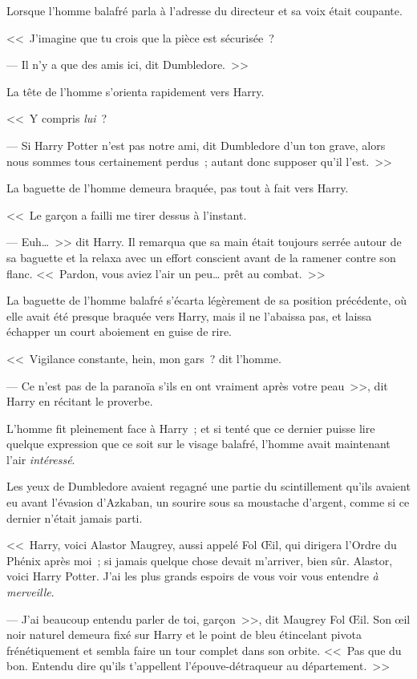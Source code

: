 Lorsque l'homme balafré parla à l'adresse du directeur et sa voix était coupante.

<<~J'imagine que tu crois que la pièce est sécurisée~?

--- Il n'y a que des amis ici, dit Dumbledore.~>>

La tête de l'homme s'orienta rapidement vers Harry.

<<~Y compris \emph{lui}~?

--- Si Harry Potter n'est pas notre ami, dit Dumbledore d'un ton grave, alors nous sommes tous certainement perdus~; autant donc supposer qu'il l'est.~>>

La baguette de l'homme demeura braquée, pas tout à fait vers Harry.

<<~Le garçon a failli me tirer dessus à l'instant.

--- Euh…~>> dit Harry. Il remarqua que sa main était toujours serrée autour de sa baguette et la relaxa avec un effort conscient avant de la ramener contre son flanc. <<~Pardon, vous aviez l'air un peu… prêt au combat.~>>

La baguette de l'homme balafré s'écarta légèrement de sa position précédente, où elle avait été presque braquée vers Harry, mais il ne l'abaissa pas, et laissa échapper un court aboiement en guise de rire.

<<~Vigilance constante, hein, mon gars~? dit l'homme.

--- Ce n'est pas de la paranoïa s'ils en ont vraiment après votre peau~>>, dit Harry en récitant le proverbe.

L'homme fit pleinement face à Harry~; et si tenté que ce dernier puisse lire quelque expression que ce soit sur le visage balafré, l'homme avait maintenant l'air \emph{intéressé}.

Les yeux de Dumbledore avaient regagné une partie du scintillement qu'ils avaient eu avant l'évasion d'Azkaban, un sourire sous sa moustache d'argent, comme si ce dernier n'était jamais parti.

<<~Harry, voici Alastor Maugrey, aussi appelé Fol Œil, qui dirigera l'Ordre du Phénix après moi~; si jamais quelque chose devait m'arriver, bien sûr. Alastor, voici Harry Potter. J'ai les plus grands espoirs de vous voir vous entendre \emph{à merveille}.

--- J'ai beaucoup entendu parler de toi, garçon~>>, dit Maugrey Fol Œil. Son œil noir naturel demeura fixé sur Harry et le point de bleu étincelant pivota frénétiquement et sembla faire un tour complet dans son orbite. <<~Pas que du bon. Entendu dire qu'ils t'appellent l'épouve-détraqueur au département.~>>

